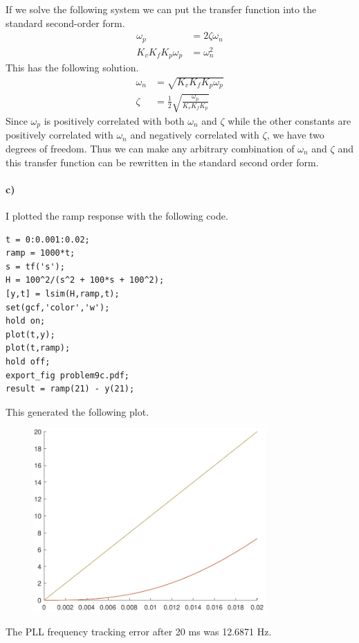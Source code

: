 \documentclass[12pt]{article}
\begin{document}
If we solve the following system we can put the transfer function into the standard second-order form.
\begin{align*}
    \omega_p &= 2\zeta\omega_n\\
    K_vK_fK_p\omega_p &= \omega_n^2
\end{align*}
This has the following solution.
\begin{align*}
    \omega_n &= \sqrt{K_vK_fK_p\omega_p}\\
    \zeta &= \frac{1}{2}\sqrt{\frac{\omega_p}{K_vK_fK_p}}
\end{align*}
Since \(\omega_p\) is positively correlated with both \(\omega_n\) and \(\zeta\) while the other constants are positively correlated with \(\omega_n\)
and negatively correlated with \(\zeta\), we have two degrees of freedom. Thus we can make any arbitrary combination of \(\omega_n\) and \(\zeta\) and
this transfer function can be rewritten in the standard second order form.

\paragraph{c)}

I plotted the ramp response with the following code.
\begin{verbatim}
t = 0:0.001:0.02;
ramp = 1000*t;
s = tf('s');
H = 100^2/(s^2 + 100*s + 100^2);
[y,t] = lsim(H,ramp,t);
set(gcf,'color','w');
hold on;
plot(t,y);
plot(t,ramp);
hold off;
export_fig problem9c.pdf;
result = ramp(21) - y(21);
\end{verbatim}
This generated the following plot.
\begin{figure}[H]
    \begin{center}
        \includegraphics[width=3.5in]{problem9c.pdf}
    \end{center}
\end{figure}
The PLL frequency tracking error after 20 ms was 12.6871 Hz.
\end{document}
